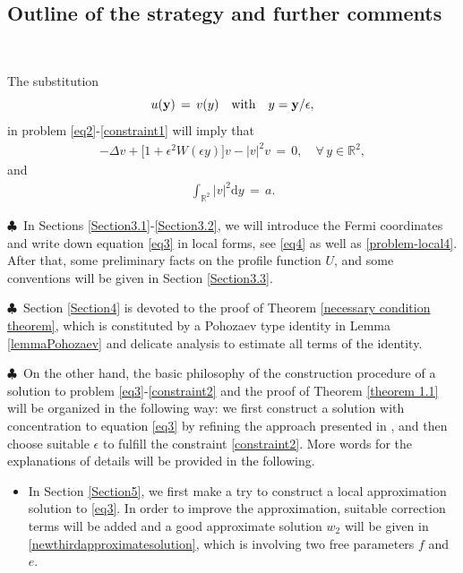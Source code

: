\documentclass[10pt, reqno]{amsart}
\numberwithin{equation}{section}
\theoremstyle{definition}
\begin{document}
{\medskip
\subsection{ Outline of the strategy and further comments}\label{Section2.3}\


The substitution
\begin{equation}\label{definitionofy}
 u ({\bf y}) \,=\, v(y)\quad\mbox{with}\quad y= {\bf y}/\epsilon,
\end{equation}
in problem \eqref{eq2}-\eqref{constraint1} will imply that
\begin{align} \label{eq3}
 -\Delta v + \big[1+ \epsilon^2 W (\epsilon y) \big] v - |v|^2 v \,=\, 0,
\quad \forall\, y\in {\mathbb R}^2,
\end{align}
and
\begin{align} \label{constraint2}
 \int_{{\mathbb R}^2} |v|^2 {\mathrm d} y \,=\, a.
\end{align}

\smallskip
\noindent$\clubsuit$\
In Sections \ref{Section3.1}-\ref{Section3.2}, we will introduce the Fermi coordinates and write down equation \eqref{eq3} in local forms,
see \eqref{eq4} as well as \eqref{problem-local4}.
After that, some preliminary facts on the profile function $U$, and some conventions will be given in Section \ref{Section3.3}.

\smallskip
\noindent$\clubsuit$\
Section \ref{Section4} is devoted to the proof of Theorem \ref{necessary condition theorem},
which is constituted by a Pohozaev type identity in Lemma \ref{lemmaPohozaev} and delicate analysis to estimate all terms of the identity.

\smallskip
\noindent$\clubsuit$\
On the other hand, the basic philosophy of the construction procedure of a solution to problem \eqref{eq3}-\eqref{constraint2} and the proof of
Theorem \ref{theorem 1.1} will be organized in the following way: we first construct a solution with concentration to equation \eqref{eq3} by refining the approach presented in \cite{delPKowWei1},
and then choose suitable $\epsilon$ to fulfill the constraint \eqref{constraint2}.
More words for the explanations of details will be provided in the following.
\begin{itemize}

\item[(1).]
In Section \ref{Section5}, we first make a try to construct a local approximation solution to \eqref{eq3}.
In order to improve the approximation, suitable correction terms will be added and a good approximate solution $w_2$ will be given in \eqref{newthirdapproximatesolution},
which is involving two free parameters $f$ and $e$.



\end{itemize}}
\end{document}
